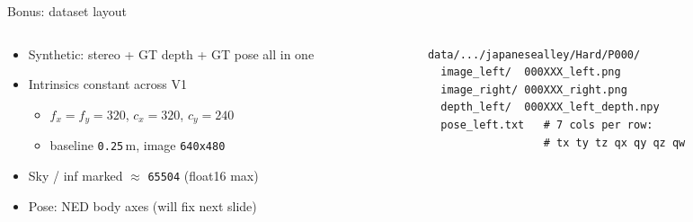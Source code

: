 \documentclass[aspectratio=169,11pt]{beamer}
\newcommand{\code}[1]{\texttt{#1}}
\begin{document}
\begin{frame}[fragile]{Bonus: dataset layout}
\begin{columns}[T,totalwidth=\textwidth]
\begin{column}{0.46\textwidth}
\begin{itemize}
    \item Synthetic: stereo + GT depth + GT pose all in one
    \item Intrinsics constant across V1
    \begin{itemize}
        \item $f_x = f_y = 320$, $c_x = 320$, $c_y = 240$
        \item baseline \code{0.25}\,m, image \code{640x480}
    \end{itemize}
    \item Sky / inf marked $\approx$ \code{65504} (float16 max)
    \item Pose: NED body axes (will fix next slide)
\end{itemize}
\end{column}
\begin{column}{0.50\textwidth}
\scriptsize
\begin{verbatim}
data/.../japanesealley/Hard/P000/
  image_left/  000XXX_left.png
  image_right/ 000XXX_right.png
  depth_left/  000XXX_left_depth.npy
  pose_left.txt   # 7 cols per row:
                  # tx ty tz qx qy qz qw
\end{verbatim}
\end{column}
\end{columns}
\end{frame}
\end{document}
